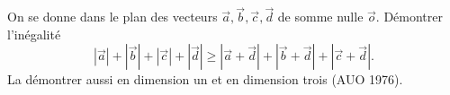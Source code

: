On se donne dans le plan des vecteurs $\vec a, \vec b, \vec c, \vec d$ de somme nulle $\vec o$. Démontrer l'inégalité
\[ |\vec a| + |\vec b| + |\vec c| + |\vec d| \geq |\vec a + \vec d| + |\vec b + \vec d| + |\vec c + \vec d|. \]
La démontrer aussi en dimension un et en dimension trois (AUO 1976).

